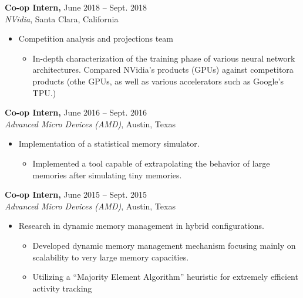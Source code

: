 \documentclass[11pt]{myres} %
\begin{document}
\begin{resume}
{\color{blue}\textbf{Co-op Intern,} June 2018 -- Sept. 2018} \\
\emph{NVidia}, Santa Clara, California \\
\begin{itemize} \itemsep -2pt
    \item Competition analysis and projections team
    \begin{itemize}
      \item In-depth characterization of the training phase of various neural network architectures. Compared NVidia's products (GPUs) against competitora products (othe GPUs, as well as various accelerators such as Google's TPU.)
    \end{itemize}
\end{itemize}

{\color{blue}\textbf{Co-op Intern,} June 2016 -- Sept. 2016} \\
\emph{Advanced Micro Devices (AMD)}, Austin, Texas \\
\begin{itemize} \itemsep -2pt
    \item Implementation of a statistical memory simulator.
    \begin{itemize}
    	\item Implemented a tool capable of extrapolating the behavior of large memories after simulating tiny memories.
    \end{itemize}
\end{itemize}

{\color{blue}\textbf{Co-op Intern,} June 2015 -- Sept. 2015} \\
\emph{Advanced Micro Devices (AMD)}, Austin, Texas \\
\begin{itemize} \itemsep -2pt
    \item Research in dynamic memory management in hybrid configurations.
    \begin{itemize}
    	\item Developed dynamic memory management mechanism focusing mainly on scalability to very large memory capacities.
    	\item Utilizing a ``Majority Element Algorithm'' heuristic for extremely efficient activity tracking
    \end{itemize}
\end{itemize}


\end{resume}
\end{document}
